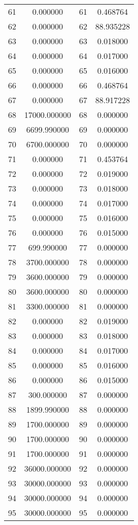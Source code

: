 \documentclass[12pt]{article}
\begin{document}
\begin{longtable}{@{}cccc@{}}
61 & 0.000000 & 61 & 0.468764 \\
62 & 0.000000 & 62 & 88.935228 \\
63 & 0.000000 & 63 & 0.018000 \\
64 & 0.000000 & 64 & 0.017000 \\
65 & 0.000000 & 65 & 0.016000 \\
66 & 0.000000 & 66 & 0.468764 \\
67 & 0.000000 & 67 & 88.917228 \\
68 & 17000.000000 & 68 & 0.000000 \\
69 & 6699.990000 & 69 & 0.000000 \\
70 & 6700.000000 & 70 & 0.000000 \\
71 & 0.000000 & 71 & 0.453764 \\
72 & 0.000000 & 72 & 0.019000 \\
73 & 0.000000 & 73 & 0.018000 \\
74 & 0.000000 & 74 & 0.017000 \\
75 & 0.000000 & 75 & 0.016000 \\
76 & 0.000000 & 76 & 0.015000 \\
77 & 699.990000 & 77 & 0.000000 \\
78 & 3700.000000 & 78 & 0.000000 \\
79 & 3600.000000 & 79 & 0.000000 \\
80 & 3600.000000 & 80 & 0.000000 \\
81 & 3300.000000 & 81 & 0.000000 \\
82 & 0.000000 & 82 & 0.019000 \\
83 & 0.000000 & 83 & 0.018000 \\
84 & 0.000000 & 84 & 0.017000 \\
85 & 0.000000 & 85 & 0.016000 \\
86 & 0.000000 & 86 & 0.015000 \\
87 & 300.000000 & 87 & 0.000000 \\
88 & 1899.990000 & 88 & 0.000000 \\
89 & 1700.000000 & 89 & 0.000000 \\
90 & 1700.000000 & 90 & 0.000000 \\
91 & 1700.000000 & 91 & 0.000000 \\
92 & 36000.000000 & 92 & 0.000000 \\
93 & 30000.000000 & 93 & 0.000000 \\
94 & 30000.000000 & 94 & 0.000000 \\
95 & 30000.000000 & 95 & 0.000000 \\

\end{longtable}
\end{document}
